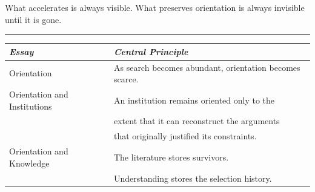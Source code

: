 What accelerates is always visible. What preserves orientation is always
invisible until it is gone.

\bigskip
\begin{center}
  \rule{0.4\textwidth}{0.4pt}
\end{center}

\medskip
\begin{center}
\begin{tabular}{ll}
\toprule
\textit{Essay} & \textit{Central Principle} \\
\midrule
Orientation & As search becomes abundant, orientation becomes scarce. \\[0.3em]
Orientation and Institutions & An institution remains oriented only to the \\
 & extent that it can reconstruct the arguments \\
 & that originally justified its constraints. \\[0.3em]
Orientation and Knowledge & The literature stores survivors. \\
 & Understanding stores the selection history. \\
\bottomrule
\end{tabular}
\end{center}


